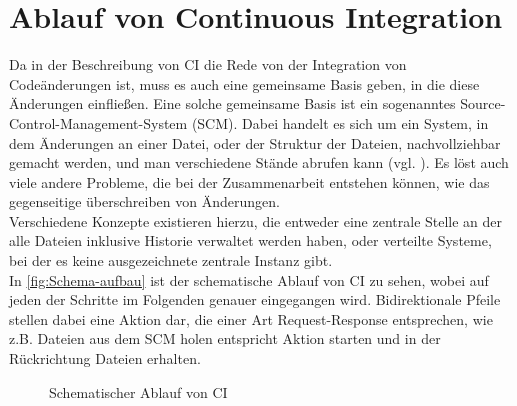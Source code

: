 \section{Ablauf von Continuous Integration}
Da in der Beschreibung von CI die Rede von der Integration von Codeänderungen ist, muss es auch eine gemeinsame Basis geben, in die diese Änderungen einfließen. Eine solche gemeinsame Basis ist ein sogenanntes Source-Control-Management-System (SCM). Dabei handelt es sich um ein System, in dem Änderungen an einer Datei, oder der Struktur der Dateien, nachvollziehbar gemacht werden, und man verschiedene Stände abrufen kann (vgl. \cite{fowler-CI}). 
Es löst auch viele andere Probleme, die bei der Zusammenarbeit entstehen können, wie das gegenseitige überschreiben von Änderungen. \\
Verschiedene Konzepte existieren hierzu, die entweder eine zentrale Stelle an der alle Dateien inklusive Historie verwaltet werden haben, oder verteilte Systeme, bei der es keine ausgezeichnete zentrale Instanz gibt.\\
In \autoref{fig:Schema-aufbau} ist der schematische Ablauf von CI zu sehen, wobei auf jeden der Schritte im Folgenden genauer eingegangen wird. Bidirektionale Pfeile stellen dabei eine Aktion dar, die einer Art Request-Response entsprechen, wie z.B. Dateien aus dem SCM holen entspricht Aktion starten und in der Rückrichtung Dateien erhalten.
\begin{figure}[h]
  \centering
  \caption{Schematischer Ablauf von CI}\label{fig:Schema-aufbau}
\end{figure}

